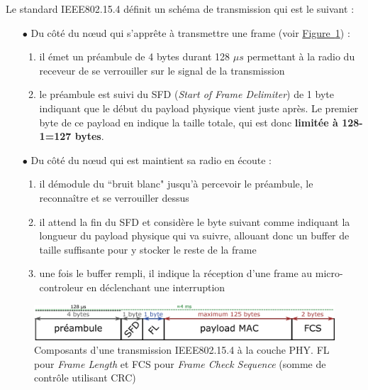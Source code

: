 \documentclass[]{report}
\newcommand{\wordlink}[2]{\hyperref[#2]{#1~\ref{#2}}}
\begin{document}
\par Le standard IEEE802.15.4 définit un schéma de transmission qui est le suivant \cite{stack-IoT} \cite{app-sec-openWSN} :
\vspace{0.2cm}
\begin{itemize}
\item[$\bullet$] Du côté du nœud qui s'apprête à transmettre une frame (voir \wordlink{Figure}{fig:IEEE802.15.4-PHY}) :
	\begin{enumerate}
	\item il émet un préambule de 4 bytes durant 128 $\mu s$ permettant à la radio du receveur de se verrouiller sur le signal de la transmission
	\item le préambule est suivi du SFD (\textit{Start of Frame Delimiter}) de 1 byte indiquant que le début du payload physique vient juste après. Le premier byte de ce payload en indique la taille totale, qui est donc \textbf{limitée à 128-1=127 bytes}.
	\end{enumerate}

\vspace{0.2cm}

\item[$\bullet$] Du côté du nœud qui est maintient sa radio en écoute :
	\begin{enumerate}
	\item il démodule du ``bruit blanc" jusqu'à percevoir le préambule, le reconnaître et se verrouiller dessus
	\item il attend la fin du SFD et considère le byte suivant comme indiquant la longueur du payload physique qui va suivre, allouant donc un buffer de taille suffisante pour y stocker le reste de la frame
	\item une fois le buffer rempli, il indique la réception d'une frame au micro-controleur en déclenchant une interruption
	\end{enumerate}

\end{itemize}

\vspace{0.8cm}

	\begin{figure}[!ht]
	\centering
	\includegraphics[width=0.9\linewidth]{IEEE802_15_4-PHY}
	\caption{Composants d'une transmission IEEE802.15.4 à la couche PHY. FL pour \textit{Frame Length} et FCS pour \textit{Frame Check Sequence} (somme de contrôle utilisant CRC)}
	\label{fig:IEEE802.15.4-PHY}
	\end{figure}
	
\end{document}
